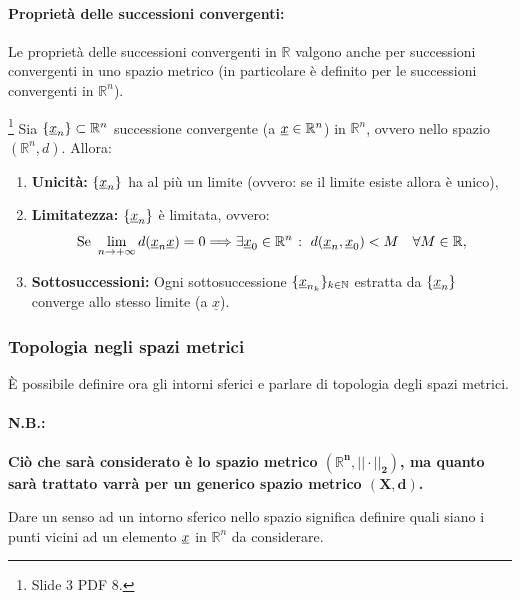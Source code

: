 \paragraph{Proprietà delle successioni convergenti:}  Le proprietà delle successioni convergenti in $\mathbb R$ valgono anche per successioni convergenti in uno spazio metrico (in particolare è definito per le successioni convergenti in $\mathbb R^n$).
\begin{proposition}\label{prop:successione_convergente_Rn}\footnote{Slide 3 PDF 8.}
    Sia $\{\uline x_n\}\subset\mathbb R^n$ successione convergente (a $\uline x\in\mathbb R^n$) in $\mathbb R^n$, ovvero nello spazio $(\mathbb R^n,d)$. Allora:
    \begin{enumerate}
        \item\textbf{Unicità:} $\{\uline x_n\}$ ha al più un limite (ovvero: se il limite esiste allora è unico),
        \item\textbf{Limitatezza:} $\{\uline x_n\}$ è limitata, ovvero:
        \begin{equation*}
            \text{Se } \lim\limits_{n\rightarrow+\infty}d(\uline x_n\uline x)=0\Longrightarrow \exists\uline x_0\in\mathbb R^n \;\colon\; d(\uline x_n, \uline x_0)<M\quad \forall M\in\mathbb R,
        \end{equation*}
        \item\textbf{Sottosuccessioni:} Ogni \gls{sottosuccessione} $\{\uline x_{n_k}\}_{k\in\mathbb N}$ estratta da $\{\uline x_n\}$ converge allo stesso limite (a $\underline x$).
    \end{enumerate}
\end{proposition}

\subsubsection{Topologia negli spazi metrici}
È possibile definire ora gli intorni sferici e parlare di topologia degli spazi metrici.

\paragraph{N.B.:} \textbf{Ciò che sarà considerato è lo spazio metrico $\boldsymbol{(\mathbb R^n,||\cdot||_2)}$, ma quanto sarà trattato varrà per un generico spazio metrico $\boldsymbol{(X,d)}$.}

Dare un senso ad un intorno sferico nello spazio significa definire quali siano i punti vicini ad un elemento $\uline x$ in $\mathbb R^n$ da considerare.

